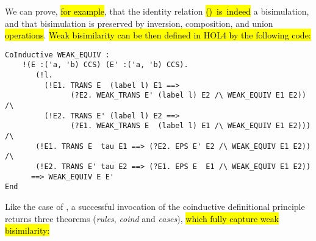 We can prove, \hl{for example}, that the identity relation \hl{\mbox{()
is indeed}} a bisimulation, and that
bisimulation is preserved by inversion, composition, and union \hl{operations}.
\hl{Weak bisimilarity can be then defined in HOL4 by the following code:}
\begin{lstlisting}
CoInductive WEAK_EQUIV :
    !(E :('a, 'b) CCS) (E' :('a, 'b) CCS).
       (!l.
         (!E1. TRANS E  (label l) E1 ==>
               (?E2. WEAK_TRANS E' (label l) E2 /\ WEAK_EQUIV E1 E2)) /\
         (!E2. TRANS E' (label l) E2 ==>
               (?E1. WEAK_TRANS E  (label l) E1 /\ WEAK_EQUIV E1 E2))) /\
       (!E1. TRANS E  tau E1 ==> (?E2. EPS E' E2 /\ WEAK_EQUIV E1 E2)) /\
       (!E2. TRANS E' tau E2 ==> (?E1. EPS E  E1 /\ WEAK_EQUIV E1 E2))
      ==> WEAK_EQUIV E E'
End
\end{lstlisting}
Like the case of , a successful invocation of the
coinductive definitional principle returns three
theorems (\emph{rules}, \emph{coind} and \emph{cases}), \hl{which
fully capture weak bisimilarity:}
